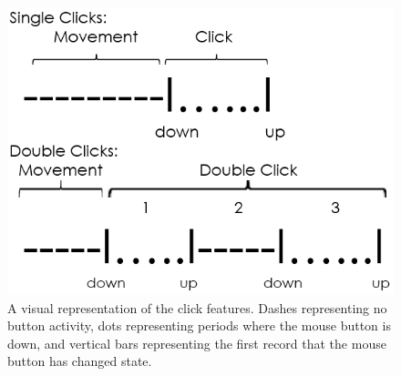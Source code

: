 \documentclass[conference]{IEEEtran}
\begin{document}
\begin{figure}[t]
  \includegraphics[width=1\linewidth]{clickDiag}
  \caption{A visual representation of the click features. Dashes representing no button activity, dots representing periods where the mouse button is down, and vertical bars representing the first record that the mouse button has changed state.  \label{fig:visualdefinition}}
\end{figure}
\end{document}

